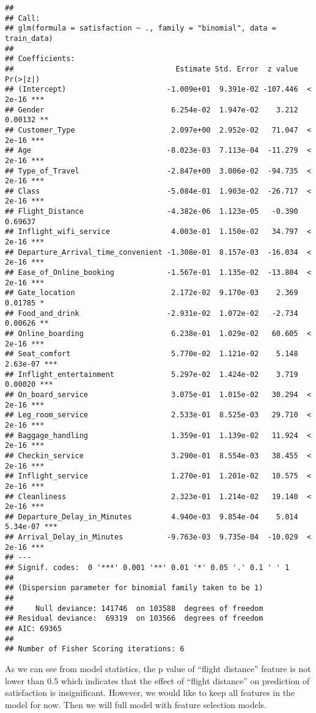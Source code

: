 \documentclass[
]{article}
\begin{document}
\begin{verbatim}
## 
## Call:
## glm(formula = satisfaction ~ ., family = "binomial", data = train_data)
## 
## Coefficients:
##                                     Estimate Std. Error  z value Pr(>|z|)    
## (Intercept)                       -1.009e+01  9.391e-02 -107.446  < 2e-16 ***
## Gender                             6.254e-02  1.947e-02    3.212  0.00132 ** 
## Customer_Type                      2.097e+00  2.952e-02   71.047  < 2e-16 ***
## Age                               -8.023e-03  7.113e-04  -11.279  < 2e-16 ***
## Type_of_Travel                    -2.847e+00  3.006e-02  -94.735  < 2e-16 ***
## Class                             -5.084e-01  1.903e-02  -26.717  < 2e-16 ***
## Flight_Distance                   -4.382e-06  1.123e-05   -0.390  0.69637    
## Inflight_wifi_service              4.003e-01  1.150e-02   34.797  < 2e-16 ***
## Departure_Arrival_time_convenient -1.308e-01  8.157e-03  -16.034  < 2e-16 ***
## Ease_of_Online_booking            -1.567e-01  1.135e-02  -13.804  < 2e-16 ***
## Gate_location                      2.172e-02  9.170e-03    2.369  0.01785 *  
## Food_and_drink                    -2.931e-02  1.072e-02   -2.734  0.00626 ** 
## Online_boarding                    6.238e-01  1.029e-02   60.605  < 2e-16 ***
## Seat_comfort                       5.770e-02  1.121e-02    5.148 2.63e-07 ***
## Inflight_entertainment             5.297e-02  1.424e-02    3.719  0.00020 ***
## On_board_service                   3.075e-01  1.015e-02   30.294  < 2e-16 ***
## Leg_room_service                   2.533e-01  8.525e-03   29.710  < 2e-16 ***
## Baggage_handling                   1.359e-01  1.139e-02   11.924  < 2e-16 ***
## Checkin_service                    3.290e-01  8.554e-03   38.455  < 2e-16 ***
## Inflight_service                   1.270e-01  1.201e-02   10.575  < 2e-16 ***
## Cleanliness                        2.323e-01  1.214e-02   19.140  < 2e-16 ***
## Departure_Delay_in_Minutes         4.940e-03  9.854e-04    5.014 5.34e-07 ***
## Arrival_Delay_in_Minutes          -9.763e-03  9.735e-04  -10.029  < 2e-16 ***
## ---
## Signif. codes:  0 '***' 0.001 '**' 0.01 '*' 0.05 '.' 0.1 ' ' 1
## 
## (Dispersion parameter for binomial family taken to be 1)
## 
##     Null deviance: 141746  on 103588  degrees of freedom
## Residual deviance:  69319  on 103566  degrees of freedom
## AIC: 69365
## 
## Number of Fisher Scoring iterations: 6
\end{verbatim}

As we can see from model statistics, the p value of ``flight distance''
feature is not lower than 0.5 which indicates that the effect of
``flight distance'' on prediction of satisfaction is insignificant.
However, we would like to keep all features in the model for now. Then
we will full model with feature selection models.
\end{document}
